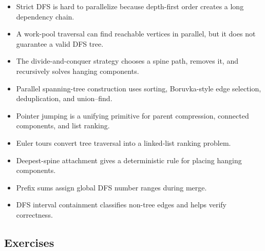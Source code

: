 \begin{itemize}
    \item Strict DFS is hard to parallelize because depth-first order creates a long dependency chain.
    \item A work-pool traversal can find reachable vertices in parallel, but it does not guarantee a valid DFS tree.
    \item The divide-and-conquer strategy chooses a spine path, removes it, and recursively solves hanging components.
    \item Parallel spanning-tree construction uses sorting, Boruvka-style edge selection, deduplication, and union--find.
    \item Pointer jumping is a unifying primitive for parent compression, connected components, and list ranking.
    \item Euler tours convert tree traversal into a linked-list ranking problem.
    \item Deepest-spine attachment gives a deterministic rule for placing hanging components.
    \item Prefix sums assign global DFS number ranges during merge.
    \item DFS interval containment classifies non-tree edges and helps verify correctness.
\end{itemize}

\subsection{Exercises}

